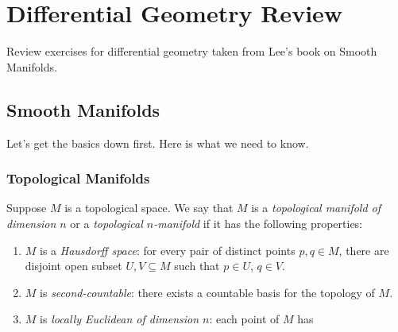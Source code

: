 \chapter{Differential Geometry Review}
Review exercises for differential geometry taken from Lee's book on Smooth
Manifolds.
\section{Smooth Manifolds}
Let's get the basics down first. Here is what we need to know.
\subsection{Topological Manifolds}
Suppose \(M\) is a topological space. We say that \(M\) is a
\emph{topological manifold of dimension \(n\)} or a \emph{topological
  \(n\)-manifold} if it has the following properties:
\begin{enumerate}
\item \(M\) is a \emph{Hausdorff space}: for every pair of distinct points
  \(p,q\in M\), there are disjoint open subset \(U,V\subseteq M\) such that
  \(p\in U\), \(q\in V\).
\item \(M\) is \emph{second-countable}: there exists a countable basis for
  the topology of \(M\).
\item \(M\) is \emph{locally Euclidean of dimension \(n\)}: each point of
  \(M\) has
\end{enumerate}

